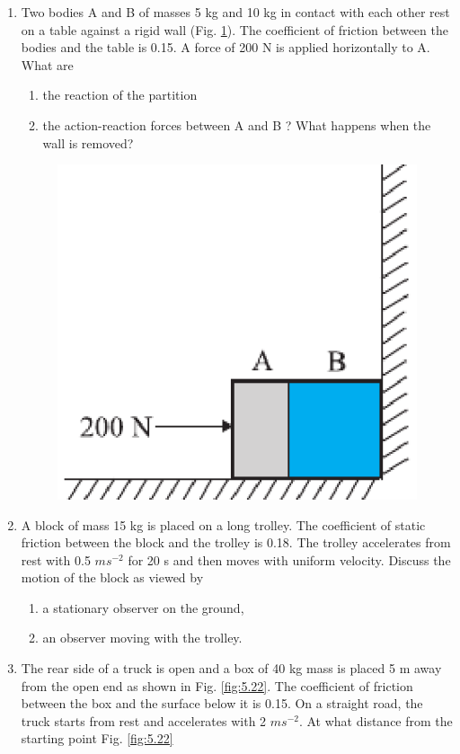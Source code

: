 \begin{enumerate}[label=\arabic*.,ref=\thesection.\theenumi]
\item Two bodies A and B of masses 5 kg and 10 kg in contact with each other rest on a table against a rigid wall (Fig. \ref{fig:5.21}). The coefficient of friction between the bodies and the table is 0.15. A force of 200 N is applied horizontally to A. What are 
\begin{enumerate}
\item the reaction of the partition 
\item the action-reaction forces between A and B ? What happens when the wall is removed? 
\end{enumerate}
\begin{figure}[!ht]
\centering
\includegraphics[width=\columnwidth]{./figs/11-1/5/5.21.eps}
\caption{}
\label{fig:5.21}
\end{figure} 
\item A block of mass 15 kg is placed on a long trolley. The coefficient of static friction between the block and the trolley is 0.18. The trolley accelerates from rest with 0.5 $m s^{-2}$
for 20 s and then moves with uniform velocity. Discuss the motion of the
block as viewed by 
\begin{enumerate}
\item a stationary observer on the ground, 
\item an observer moving with the trolley.
\end{enumerate}
\item The rear side of a truck is open and a box of 40 kg mass is placed 5 m away from the open end as shown in Fig. \ref{fig:5.22}. The coefficient of friction between the box and the surface below it is 0.15. On a straight road, the truck starts from rest and accelerates with 2 $m s^{-2}$. At what distance from the starting point Fig. \ref{fig:5.22}

\end{enumerate}

